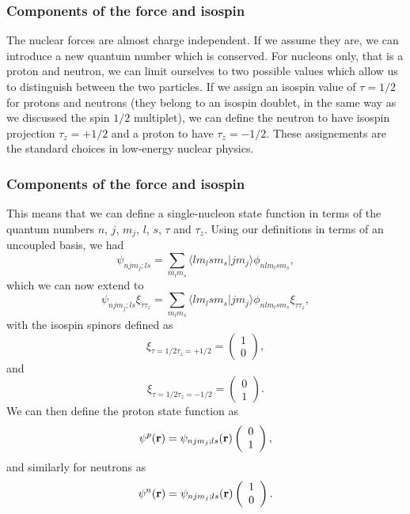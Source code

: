 \documentclass[compress]{beamer}
\begin{document}
\frame
{
\frametitle{Components of the force and isospin}
\begin{small}
{\scriptsize
 The nuclear forces are almost charge independent. If we assume they are, 
we can introduce a new quantum number which is conserved. For nucleons only, that is a proton and neutron, we can limit ourselves
to two possible values which allow us to distinguish between the two particles. If we assign an isospin value of $\tau=1/2$ for protons
and neutrons (they belong to an isospin doublet, in the same way as we discussed the spin $1/2$ multiplet), we can define 
the neutron to have isospin projection $\tau_z=+1/2$ and a proton to have $\tau_z=-1/2$. These assignements are the standard choices in low-energy nuclear physics.
}
\end{small}
}
\frame
{
\frametitle{Components of the force and isospin}
\begin{small}
{\scriptsize
This means that we can define a single-nucleon
state function in terms of the quantum numbers $n$, $j$, $m_j$, $l$, $s$, $\tau$ and $\tau_z$. Using our definitions in terms of an uncoupled basis, we had 
\[
\psi_{njm_j;ls}=\sum_{m_lm_s}\langle lm_lsm_s|jm_j\rangle\phi_{nlm_lsm_s},
\]
which we can now extend to
\[
\psi_{njm_j;ls}\xi_{\tau\tau_z}=\sum_{m_lm_s}\langle lm_lsm_s|jm_j\rangle\phi_{nlm_lsm_s}\xi_{\tau\tau_z},
\]
with the isospin spinors defined as 
\[
\xi_{\tau=1/2\tau_z=+1/2}=\left(\begin{array}{c} 1  \\ 0\end{array}\right),
\]
and
\[
\xi_{\tau=1/2\tau_z=-1/2}=\left(\begin{array}{c} 0  \\ 1\end{array}\right).
\]
We can then define the proton state function as 
\[
\psi^p({\bf r})  =\psi_{njm_j;ls}({\bf r})\left(\begin{array}{c} 0  \\ 1\end{array}\right), 
\]
and similarly for neutrons as
\[
\psi^n({\bf r})  =\psi_{njm_j;ls}({\bf r})\left(\begin{array}{c} 1  \\ 0\end{array}\right). 
\]
}
\end{small}
}
\end{document}
